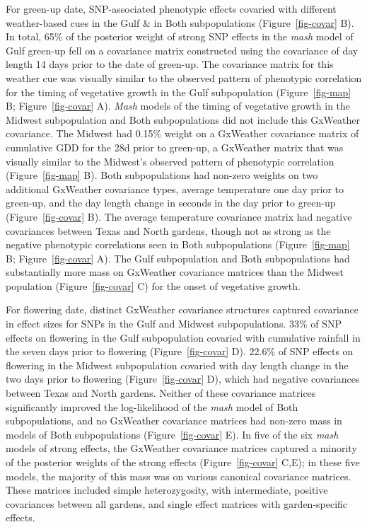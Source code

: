 \documentclass[
  9pt,
  twocolumn,
  twoside]{pnas-new}
\begin{document}
For green-up date, SNP-associated phenotypic effects covaried with
different weather-based cues in the Gulf \& in Both subpopulations
(Figure~\ref{fig-covar} B). In total, 65\% of the posterior weight of
strong SNP effects in the \emph{mash} model of Gulf green-up fell on a
covariance matrix constructed using the covariance of day length 14 days
prior to the date of green-up. The covariance matrix for this weather
cue was visually similar to the observed pattern of phenotypic
correlation for the timing of vegetative growth in the Gulf
subpopulation (Figure~\ref{fig-map} B; Figure~\ref{fig-covar} A).
\emph{Mash} models of the timing of vegetative growth in the Midwest
subpopulation and Both subpopulations did not include this GxWeather
covariance. The Midwest had 0.15\% weight on a GxWeather covariance
matrix of cumulative GDD for the 28d prior to green-up, a GxWeather
matrix that was visually similar to the Midwest's observed pattern of
phenotypic correlation (Figure~\ref{fig-map} B). Both subpopulations had
non-zero weights on two additional GxWeather covariance types, average
temperature one day prior to green-up, and the day length change in
seconds in the day prior to green-up (Figure~\ref{fig-covar} B). The
average temperature covariance matrix had negative covariances between
Texas and North gardens, though not as strong as the negative phenotypic
correlations seen in Both subpopulations (Figure~\ref{fig-map} B;
Figure~\ref{fig-covar} A). The Gulf subpopulation and Both
subpopulations had substantially more mass on GxWeather covariance
matrices than the Midwest population (Figure~\ref{fig-covar} C) for the
onset of vegetative growth.

For flowering date, distinct GxWeather covariance structures captured
covariance in effect sizes for SNPs in the Gulf and Midwest
subpopulations. 33\% of SNP effects on flowering in the Gulf
subpopulation covaried with cumulative rainfall in the seven days prior
to flowering (Figure~\ref{fig-covar} D). 22.6\% of SNP effects on
flowering in the Midwest subpopulation covaried with day length change
in the two days prior to flowering (Figure~\ref{fig-covar} D), which had
negative covariances between Texas and North gardens. Neither of these
covariance matrices significantly improved the log-likelihood of the
\emph{mash} model of Both subpopulations, and no GxWeather covariance
matrices had non-zero mass in models of Both subpopulations
(Figure~\ref{fig-covar} E). In five of the six \emph{mash} models of
strong effects, the GxWeather covariance matrices captured a minority of
the posterior weights of the strong effects (Figure~\ref{fig-covar}
C,E); in these five models, the majority of this mass was on various
canonical covariance matrices. These matrices included simple
heterozygosity, with intermediate, positive covariances between all
gardens, and single effect matrices with garden-specific effects.
\end{document}
